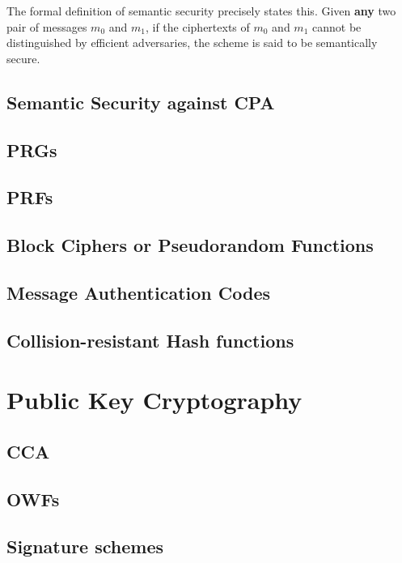 \documentclass[A4, 11pt]{article}
\begin{document}
The formal definition of semantic security precisely states this. Given
{\bf any} two pair of messages $m_0$ and $m_1$, if the ciphertexts of $m_0$
and $m_1$ cannot be distinguished by efficient adversaries, the scheme is
said to be semantically secure. 

\subsection{Semantic Security against CPA}

\subsection{PRGs}

\subsection{PRFs}

\subsection{Block Ciphers or Pseudorandom Functions}

\subsection{Message Authentication Codes}

\subsection{Collision-resistant Hash functions}

\section{Public Key Cryptography}


\subsection{CCA}

\subsection{OWFs}

\subsection{Signature schemes}
\end{document}
